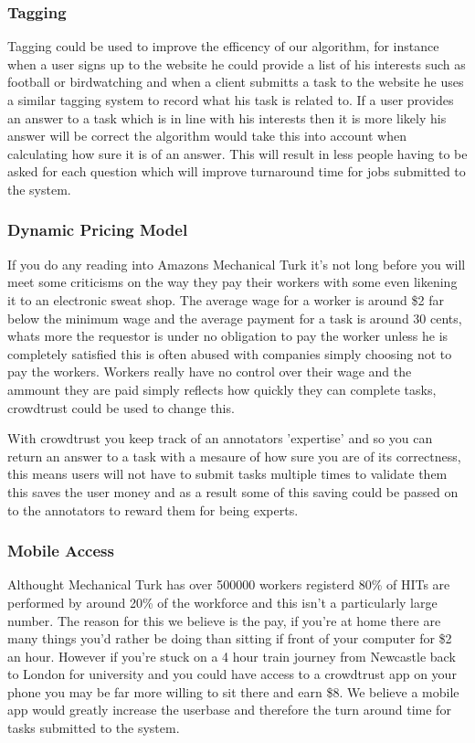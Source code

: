 \documentclass[11pt]{article}
\begin{document}
\subsubsection{Tagging}
Tagging could be used to improve the efficency of our algorithm, for instance when a user signs up to the website he could provide a list of his
interests such as football or birdwatching and when a client submitts a task to the website he uses a similar tagging system to record what his
task is related to. If a user provides an answer to a task which is in line with his interests then it is more likely his answer will be correct
the algorithm would take this into account when calculating how sure it is of an answer. This will result in less people having to be asked 
for each question which will improve turnaround time for jobs submitted to the system. 


\subsubsection{Dynamic Pricing Model}
If you do any reading into Amazons Mechanical Turk it's not long before you will meet some criticisms on the way they pay their workers with some
even likening it to an electronic sweat shop. The average wage for a worker is around \$2 far below the minimum wage and the average payment for 
a task is around 30 cents, whats more the requestor is under no obligation to pay the worker unless he is completely satisfied this is often abused
with companies simply choosing not to pay the workers. Workers really have no control over their wage and the ammount they are paid simply 
reflects how quickly they can complete tasks, crowdtrust could be used to change this.

With crowdtrust you keep track of an annotators 'expertise' and so you can return an answer to a task with a mesaure of how sure you are of its
correctness, this means users will not have to submit tasks multiple times to validate them this saves the user money and as a result some of this
saving could be passed on to the annotators to reward them for being experts.   

\subsubsection{Mobile Access}
Althought Mechanical Turk has over 500000 workers registerd 80\% of HITs are performed by around 20\% of the workforce and this isn't a 
particularly large number. The reason for this we believe is the pay, if you're at home there are many things you'd rather be doing than sitting
if front of your computer for \$2 an hour. However if you're stuck on a 4 hour train journey from Newcastle back to London for university and
you could have access to a crowdtrust app on your phone you may be far more willing to sit there and earn \$8. We believe a mobile app would 
greatly increase the userbase and therefore the turn around time for tasks submitted to the system. 
\end{document}
